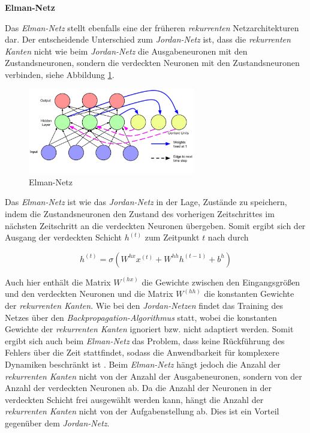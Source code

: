 \textbf{Elman-Netz}

Das \textit{Elman-Netz} stellt ebenfalls eine der früheren \textit{rekurrenten} Netzarchitekturen dar. Der entscheidende Unterschied zum \textit{Jordan-Netz} ist, dass die \textit{rekurrenten Kanten} nicht wie beim \textit{Jordan-Netz} die Ausgabeneuronen mit den Zustandsneuronen, sondern die verdeckten Neuronen mit den Zustandsneuronen verbinden, siehe Abbildung \ref{fig:elman}.

\begin{figure} [h]
	\centering
	\includegraphics[width=0.65\textwidth]{images/elman}
	\caption{Elman-Netz \cite{Lipton.5292015}}
	\label{fig:elman}
\end{figure}

Das \textit{Elman-Netz} ist wie das \textit{Jordan-Netz} in der Lage, Zustände zu speichern, indem die Zustandsneuronen den Zustand des vorherigen Zeitschrittes im nächsten Zeitschritt an die verdeckten Neuronen übergeben. Somit ergibt sich der Ausgang der verdeckten Schicht $h^{(t)}$ zum Zeitpunkt $t$ nach \cite{Elman.1990} durch 

\begin{equation}
h^{(t)} = \sigma(W^{hx}x^{(t)} + W^{hh}h^{(t-1)} + b^{h})
\end{equation}

Auch hier enthält die Matrix $W^{(hx)}$ die Gewichte zwischen den Eingangsgrößen und den verdeckten Neuronen und die Matrix $W^{(hh)}$ die konstanten Gewichte der \textit{rekurrenten Kanten}.
Wie bei den \textit{Jordan-Netzen} findet das Training des Netzes über den \textit{Backpropagation-Algorithmus} statt, wobei die konstanten Gewichte der \textit{rekurrenten Kanten} ignoriert bzw. nicht adaptiert werden. 
Somit ergibt sich auch beim \textit{Elman-Netz} das Problem, dass keine Rückführung des Fehlers über die Zeit stattfindet, sodass die Anwendbarkeit für komplexere Dynamiken beschränkt ist \cite{Lipton.5292015}. Beim \textit{Elman-Netz} hängt jedoch die Anzahl der \textit{rekurrenten Kanten} nicht von der Anzahl der Ausgabeneuronen, sondern von der Anzahl der verdeckten Neuronen ab. Da die Anzahl der Neuronen in der verdeckten Schicht frei ausgewählt werden kann, hängt die Anzahl der \textit{rekurrenten Kanten} nicht von der Aufgabenstellung ab. Dies ist ein Vorteil gegenüber dem \textit{Jordan-Netz}.

